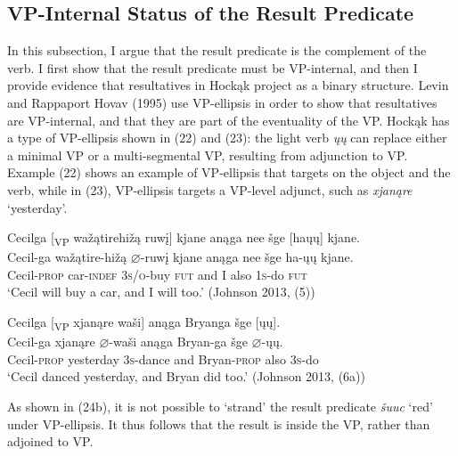 \documentclass[output=paper]{LSP/langsci}
\begin{document}
\subsection{VP-Internal Status of the Result Predicate}

In this subsection, I argue that the result predicate is the complement of the verb. I first show that the result predicate must be VP-internal, and then I provide evidence that resultatives in Hockąk project as a binary structure. Levin and Rappaport Hovav (1995) use VP-ellipsis in order to show that resultatives are VP-internal, and that they are part of the eventuality of the VP. Hockąk has a type of VP-ellipsis shown in (22) and (23): the light verb \textit{ųų} can replace either a minimal VP or a multi-segmental VP, resulting from adjunction to VP. Example (22) shows an example of VP-ellipsis that targets on the object and the verb, while in (23), VP-ellipsis targets a VP-level adjunct, such as \textit{xjanąre} `yesterday'.

\begin{exe}

\ex \glll Cecilga [\textsubscript{VP} wažątirehižą ruwį] kjane anąga nee šge [haųų] kjane.\\
Cecil-ga {} wažątire-hižą {$\varnothing$}-ruwį kjane anąga nee šge ha-ųų kjane.\\
Cecil-\textsc{prop} {} car-\textsc{indef} \textsc{3s/o}-buy \textsc{fut} and I also \textsc{1s}-do \textsc{fut}\\
\glt `Cecil will buy a car, and I will too.' (Johnson 2013, (5))

\ex \glll Cecilga [\textsubscript{VP} xjanąre waši] anąga Bryanga šge [ųų].\\
Cecil-ga {} xjanąre {$\varnothing$}-waši anąga Bryan-ga šge {$\varnothing$}-ųų.\\
Cecil-\textsc{prop} {} yesterday \textsc{3s}-dance and Bryan-\textsc{prop} also \textsc{3s}-do\\
\glt `Cecil danced yesterday, and Bryan did too.' (Johnson 2013, (6a))

\end{exe}

As shown in (24b), it is not possible to `strand' the result predicate \textit{šuuc} `red' under VP-ellipsis. It thus follows that the result is inside the VP, rather than adjoined to VP.
\end{document}
